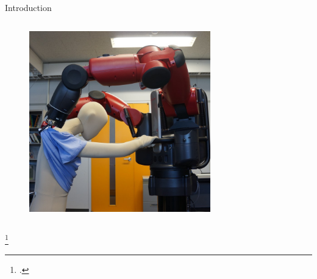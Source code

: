 \documentclass[aspectratio=43,11pt,xcolor={dvipsnames}]{beamer}
\begin{document}
\begin{frame}{Introduction}
\begin{columns}[t]
		\begin{column}{0.25\textwidth}
			\begin{figure}
				\includegraphics[width=0.7\textwidth]{robotic_clothing_assistance}
			\end{figure}
		\end{column}
	\end{columns}
	
	\footcitetext{jonMcDonald2016japan}
\end{frame}
\end{document}
